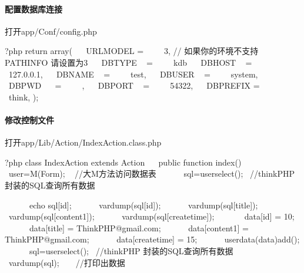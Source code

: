 \documentclass[a4,10pt,oneside,english]{sphinxmanual}
\begin{document}
\paragraph{配置数据库连接}
\label{\detokenize{interface/thinkPHP:id4}}
打开app/Conf/config.php

\begin{sphinxVerbatim}[commandchars=\\\{\}]
\PYGZlt{}?php
return array(
    \PYGZsq{}URL\PYGZus{}MODEL\PYGZsq{} =\PYGZgt{}      3, // 如果你的环境不支持PATHINFO 请设置为3
    \PYGZsq{}DB\PYGZus{}TYPE\PYGZsq{}   =\PYGZgt{}      \PYGZsq{}kdb\PYGZsq{}
    \PYGZsq{}DB\PYGZus{}HOST\PYGZsq{}   =\PYGZgt{}      \PYGZsq{}127.0.0.1\PYGZsq{},
    \PYGZsq{}DB\PYGZus{}NAME\PYGZsq{}   =\PYGZgt{}      \PYGZsq{}test\PYGZsq{},
    \PYGZsq{}DB\PYGZus{}USER\PYGZsq{}   =\PYGZgt{}      \PYGZsq{}system\PYGZsq{},
    \PYGZsq{}DB\PYGZus{}PWD\PYGZsq{}    =\PYGZgt{}      \PYGZsq{}\PYGZsq{},
    \PYGZsq{}DB\PYGZus{}PORT\PYGZsq{}   =\PYGZgt{}      \PYGZsq{}54322\PYGZsq{},
    \PYGZsq{}DB\PYGZus{}PREFIX\PYGZsq{} =\PYGZgt{}      \PYGZsq{}think\PYGZus{}\PYGZsq{},
);
\end{sphinxVerbatim}


\paragraph{修改控制文件}
\label{\detokenize{interface/thinkPHP:id5}}
打开app/Lib/Action/IndexAction.class.php

\begin{sphinxVerbatim}[commandchars=\\\{\}]
\PYGZlt{}?php
class IndexAction extends Action \PYGZob{}
    public function index()\PYGZob{}
        \PYGZdl{}user=M(\PYGZsq{}Form\PYGZsq{});   //大M方法访问数据表
        \PYGZdl{}sql=\PYGZdl{}user\PYGZhy{}\PYGZgt{}select();  //thinkPHP 封装的SQL查询所有数据

        echo \PYGZdl{}sql[\PYGZsq{}id\PYGZsq{}];
        var\PYGZus{}dump(\PYGZdl{}sql[\PYGZsq{}id\PYGZsq{}]);
        var\PYGZus{}dump(\PYGZdl{}sql[\PYGZsq{}title\PYGZsq{}]);
        var\PYGZus{}dump(\PYGZdl{}sql[\PYGZsq{}content1\PYGZsq{}]);
        var\PYGZus{}dump(\PYGZdl{}sql[\PYGZsq{}create\PYGZus{}time\PYGZsq{}]);
​
        \PYGZdl{}data[\PYGZsq{}id\PYGZsq{}] = 10;
        \PYGZdl{}data[\PYGZsq{}title\PYGZsq{}] = \PYGZsq{}ThinkPHP@gmail.com\PYGZsq{};
        \PYGZdl{}data[\PYGZsq{}content1\PYGZsq{}] = \PYGZsq{}ThinkPHP@gmail.com\PYGZsq{};
        \PYGZdl{}data[\PYGZsq{}create\PYGZus{}time\PYGZsq{}] = 15;
        \PYGZdl{}user\PYGZhy{}\PYGZgt{}data(\PYGZdl{}data)\PYGZhy{}\PYGZgt{}add();
        \PYGZdl{}sql=\PYGZdl{}user\PYGZhy{}\PYGZgt{}select();  //thinkPHP 封装的SQL查询所有数据
        var\PYGZus{}dump(\PYGZdl{}sql);     //打印出数据
    \PYGZcb{}
\PYGZcb{}
\end{sphinxVerbatim}
\end{document}
